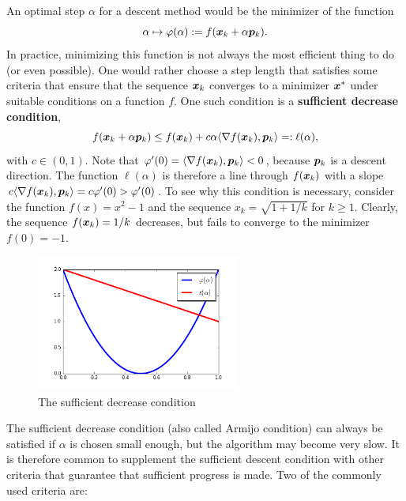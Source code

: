 An optimal step $\alpha$ for a descent method would be the minimizer of the function
\begin{equation*}
 \alpha \mapsto \varphi(\alpha) := f(\bm{x}_k+\alpha \bm{p}_k).
\end{equation*}
In practice, minimizing this function is not always the most efficient thing to do (or even possible). One would rather choose a step length that satisfies some criteria that ensure that the sequence $\bm{x}_k$ converges to a minimizer $\bm{x}^*$ under suitable conditions on a function $f$. One such condition is a \textbf{sufficient decrease condition},
\begin{equation*}
 f(\bm{x}_k+\alpha \bm{p}_k) \leq f(\bm{x}_k) + c \alpha\langle {\nabla f(\bm{x}_k)}, {\bm{p}_k} \rangle =: \ell(\alpha),
\end{equation*}
with $c\in (0,1)$. Note that $\varphi'(0) = \langle {\nabla f(\bm{x}_k)}, {\bm{p}_k} \rangle <0$, because $\bm{p}_k$ is a descent direction. The function $\ell(\alpha)$ is therefore a line through $f(\bm{x}_k)$ with a slope $c \langle {\nabla f(\bm{x}_k)}, {\bm{p}_k} \rangle = c\varphi'(0)>\varphi'(0)$. To see why this condition is necessary, consider the function $f(x)=x^2-1$ and the sequence $x_k = \sqrt{1+1/k}$ for $k\geq 1$. Clearly, the sequence $f(\bm{x}_k)=1/k$ decreases, but fails to converge to the minimizer $f(0)=-1$.

\begin{figure}[h!]
\centering
\includegraphics[width=0.6\textwidth]{images/armillo.png}
\caption{The sufficient decrease condition}
\end{figure}

The sufficient decrease condition (also called Armijo condition) can always be satisfied if $\alpha$ is chosen small enough, but the algorithm may become very slow. It is therefore common to supplement the sufficient descent condition with other criteria that guarantee that sufficient progress is made. Two of the commonly used criteria are:


